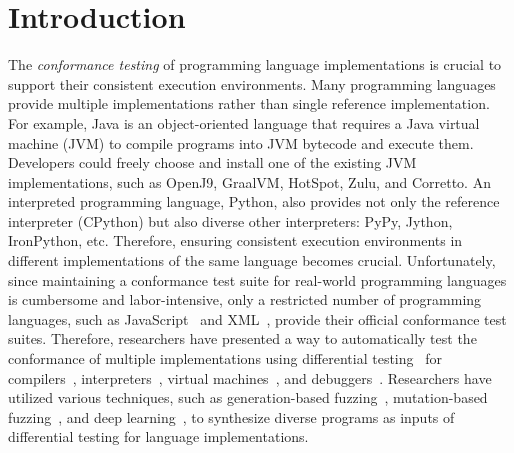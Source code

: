 \section{Introduction}\label{sec:intro}

The \textit{conformance testing} of programming language implementations is
crucial to support their consistent execution environments.
%
Many programming languages provide multiple implementations rather than single
reference implementation.
%
For example, Java is an object-oriented language that requires a Java virtual
machine (JVM) to compile programs into JVM bytecode and execute them.
%
Developers could freely choose and install one of the existing JVM
implementations, such as OpenJ9, GraalVM, HotSpot, Zulu, and Corretto.
%
An interpreted programming language, Python, also provides not only the
reference interpreter (CPython) but also diverse other interpreters: PyPy,
Jython, IronPython, etc.
%
Therefore, ensuring consistent execution environments in different
implementations of the same language becomes crucial.
%
Unfortunately, since maintaining a conformance test suite for real-world
programming languages is cumbersome and labor-intensive, only a restricted number
of programming languages, such as JavaScript~\cite{test262} and
XML~\cite{xml-test-suite}, provide their official conformance test suites.
%
Therefore, researchers have presented a way to automatically test the
conformance of multiple implementations using differential
testing~\cite{diff-test} for compilers~\cite{csmith, deep-smith, diff-cpp-front,
diff-test-embedded}, interpreters~\cite{jit-picking, comfort}, virtual
machines~\cite{java-diff-test}, and debuggers~\cite{diff-debugger}.
%
Researchers have utilized various techniques, such as generation-based
fuzzing~\cite{csmith, jit-picking, diff-test-embedded, diff-debugger},
mutation-based fuzzing~\cite{java-diff-test, diff-cpp-front}, and deep
learning~\cite{comfort, deep-smith}, to synthesize diverse programs as inputs of
differential testing for language implementations.


